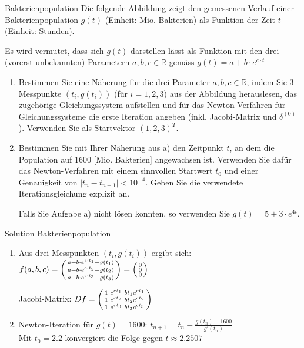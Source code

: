 \begin{example2}{Bakterienpopulation}
Die folgende Abbildung zeigt den gemessenen Verlauf einer Bakterienpopulation $g(t)$ (Einheit: Mio. Bakterien) als Funktion der Zeit $t$ (Einheit: Stunden).

Es wird vermutet, dass sich $g(t)$ darstellen lässt als Funktion mit den drei (vorerst unbekannten) Parametern $a, b, c \in \mathbb{R}$ gemäss
$g(t) = a + b \cdot e^{c\cdot t}$
\begin{enumerate}
    \item Bestimmen Sie eine Näherung für die drei Parameter $a, b, c \in \mathbb{R}$, indem Sie 3 Messpunkte $(t_i, g(t_i))$ (für $i = 1, 2, 3$) aus der Abbildung herauslesen, das zugehörige Gleichungssystem aufstellen und für das Newton-Verfahren für Gleichungssysteme die erste Iteration angeben (inkl. Jacobi-Matrix und $\delta^{(0)}$). Verwenden Sie als Startvektor $(1, 2, 3)^T$.

    \item Bestimmen Sie mit Ihrer Näherung aus a) den Zeitpunkt $t$, an dem die Population auf 1600 [Mio. Bakterien] angewachsen ist. Verwenden Sie dafür das Newton-Verfahren mit einem sinnvollen Startwert $t_0$ und einer Genauigkeit von $|t_n - t_{n-1}| < 10^{-4}$. Geben Sie die verwendete Iterationsgleichung explizit an.

    Falls Sie Aufgabe a) nicht lösen konnten, so verwenden Sie $g(t) = 5 + 3 \cdot e^{4t}$.
\end{enumerate}
\end{example2}

\begin{KR}{Solution Bakterienpopulation}
\begin{enumerate}
    \item Aus drei Messpunkten $(t_i,g(t_i))$ ergibt sich:\\
    $f(a,b,c) = \begin{psmallmatrix} 
    a + b\cdot e^{c\cdot t_1} - g(t_1)\\
    a + b\cdot e^{c\cdot t_2} - g(t_2)\\
    a + b\cdot e^{c\cdot t_3} - g(t_3)
    \end{psmallmatrix} = \begin{psmallmatrix}0\\0\\0\end{psmallmatrix}$
    
    Jacobi-Matrix:
    $Df = \begin{psmallmatrix}
    1 & e^{ct_1} & bt_1e^{ct_1}\\
    1 & e^{ct_2} & bt_2e^{ct_2}\\
    1 & e^{ct_3} & bt_3e^{ct_3}
    \end{psmallmatrix}$
    
    \item Newton-Iteration für $g(t) = 1600$:
    $t_{n+1} = t_n - \frac{g(t_n)-1600}{g'(t_n)}$\\
    Mit $t_0 = 2.2$ konvergiert die Folge gegen $t \approx 2.2507$
\end{enumerate}
\end{KR}


